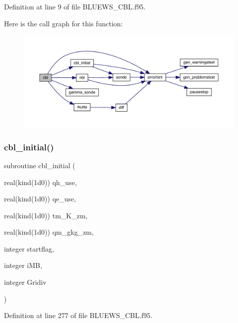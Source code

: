Definition at line 9 of file B\+L\+U\+E\+W\+S\+\_\+\+C\+B\+L.\+f95.

Here is the call graph for this function\+:\nopagebreak
\begin{figure}[H]
\begin{center}
\leavevmode
\includegraphics[width=350pt]{_b_l_u_e_w_s___c_b_l_8f95_acde23a276c692f0ec2a493dc9720471c_cgraph}
\end{center}
\end{figure}
\mbox{\label{_b_l_u_e_w_s___c_b_l_8f95_a2070c594a28f66b5ee4b95cd0251621e}} 
\subsubsection{\texorpdfstring{cbl\+\_\+initial()}{cbl\_initial()}}
{\footnotesize\ttfamily subroutine cbl\+\_\+initial (\begin{DoxyParamCaption}\item[{real(kind(1d0))}]{qh\+\_\+use,  }\item[{real(kind(1d0))}]{qe\+\_\+use,  }\item[{real(kind(1d0))}]{tm\+\_\+\+K\+\_\+zm,  }\item[{real(kind(1d0))}]{qm\+\_\+gkg\+\_\+zm,  }\item[{integer}]{startflag,  }\item[{integer}]{i\+MB,  }\item[{integer}]{Gridiv }\end{DoxyParamCaption})}



Definition at line 277 of file B\+L\+U\+E\+W\+S\+\_\+\+C\+B\+L.\+f95.

